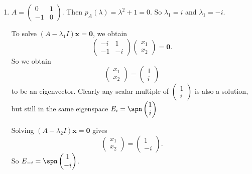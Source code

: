 \documentclass[a4paper]{article}
\begin{document}
    \begin{eg}\leavevmode
      \begin{enumerate}
        \item $A = \begin{pmatrix} 0 & 1\\
            -1 & 0
          \end{pmatrix}$. Then $p_A(\lambda) = \lambda^2 + 1 = 0$. So $\lambda_1 = i$ and $\lambda_1 = -i$.

          To solve $(A - \lambda_1 I)\mathbf{x} = \mathbf{0}$, we obtain
          \[
            \begin{pmatrix}
              -i & 1\\-1 & -i
            \end{pmatrix}
            \begin{pmatrix}
              x_1\\x_2
            \end{pmatrix}
            = \mathbf{0}.
          \]
          So we obtain
          \[
            \begin{pmatrix}
              x_1\\x_2
            \end{pmatrix} =
            \begin{pmatrix}
              1\\i
            \end{pmatrix}
          \]
          to be an eigenvector. Clearly any scalar multiple of $\begin{pmatrix}
            1\\i
          \end{pmatrix}$ is also a solution, but still in the same eigenspace $E_i = \spn \begin{pmatrix}
            1\\i
          \end{pmatrix}$

          Solving $(A - \lambda_2I)\mathbf{x} = \mathbf{0}$ gives 
          \[
            \begin{pmatrix}
              x_1\\x_2
            \end{pmatrix} =
            \begin{pmatrix}
              1\\-i
            \end{pmatrix}.
          \]
          So $E_{-i} = \spn
          \begin{pmatrix}
            1\\-i
          \end{pmatrix}$.


\end{enumerate}
\end{eg}
\end{document}
